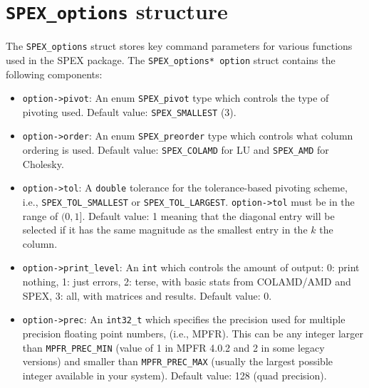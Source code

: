 \documentclass[12pt,oneside]{book}
\theoremstyle{definition}
\begin{document}
\section{\texttt{SPEX\_options} structure} \label{ss:SPEX_options_struct}
The \verb|SPEX_options| struct stores key command parameters for various
functions used in the SPEX package. The \verb|SPEX_options* option| struct
contains the following components:

\begin{itemize}
    \item \verb|option->pivot|: An enum \verb|SPEX_pivot| type which controls the type of pivoting used. Default value: \verb|SPEX_SMALLEST| (3).

    \item \verb|option->order|: An enum \verb|SPEX_preorder| type which controls what column ordering is used. Default value: \verb|SPEX_COLAMD| for LU and \verb|SPEX_AMD| for Cholesky.

    \item \verb|option->tol|: A \verb|double| tolerance for the tolerance-based pivoting scheme, i.e., \newline \verb|SPEX_TOL_SMALLEST| or \verb|SPEX_TOL_LARGEST|. \verb|option->tol| must be in the range of $(0,1]$. Default value: 1 meaning that the diagonal entry will be selected if it has the same magnitude as the smallest entry in the $k$ the column.

    \item \verb|option->print_level|: An \verb|int| which controls the amount of output: 0: print nothing, 1: just errors, 2: terse, with basic stats from COLAMD/AMD and SPEX, 3: all, with matrices and results. Default value: 0.

    \item  \verb|option->prec|: An \verb|int32_t| which specifies the precision used for multiple precision floating point numbers, (i.e., MPFR). This can be any integer larger than \verb|MPFR_PREC_MIN| (value of 1 in MPFR 4.0.2 and 2 in some legacy versions) and smaller than \verb|MPFR_PREC_MAX| (usually the largest possible integer available in your system). Default value: 128 (quad precision).


\end{itemize}
\end{document}
